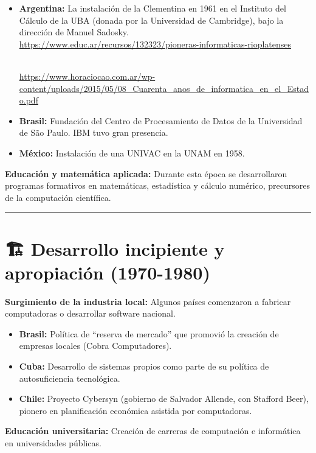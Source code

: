 \documentclass[
  letterpaper,
  DIV=11,
  numbers=noendperiod]{scrreprt}
\providecommand{\tightlist}{%
  \setlength{\itemsep}{0pt}\setlength{\parskip}{0pt}}
\begin{document}
\begin{itemize}
\item
  \textbf{Argentina:} La instalación de la Clementina en 1961 en el
  Instituto del Cálculo de la UBA (donada por la Universidad de
  Cambridge), bajo la dirección de Manuel Sadosky.\\
  \url{https://www.educ.ar/recursos/132323/pioneras-informaticas-rioplatenses}\strut \\
  \url{https://www.horaciocao.com.ar/wp-content/uploads/2015/05/08_Cuarenta_anos_de_informatica_en_el_Estado.pdf}
\item
  \textbf{Brasil:} Fundación del Centro de Procesamiento de Datos de la
  Universidad de São Paulo. IBM tuvo gran presencia.
\item
  \textbf{México:} Instalación de una UNIVAC en la UNAM en 1958.
\end{itemize}

\textbf{Educación y matemática aplicada:} Durante esta época se
desarrollaron programas formativos en matemáticas, estadística y cálculo
numérico, precursores de la computación científica.

\begin{center}\rule{0.5\linewidth}{0.5pt}\end{center}

\section{🏗️ Desarrollo incipiente y apropiación
(1970-1980)}\label{desarrollo-incipiente-y-apropiaciuxf3n-1970-1980}

\textbf{Surgimiento de la industria local:} Algunos países comenzaron a
fabricar computadoras o desarrollar software nacional.

\begin{itemize}
\tightlist
\item
  \textbf{Brasil:} Política de ``reserva de mercado'' que promovió la
  creación de empresas locales (Cobra Computadores).
\item
  \textbf{Cuba:} Desarrollo de sistemas propios como parte de su
  política de autosuficiencia tecnológica.
\item
  \textbf{Chile:} Proyecto Cybersyn (gobierno de Salvador Allende, con
  Stafford Beer), pionero en planificación económica asistida por
  computadoras.
\end{itemize}

\textbf{Educación universitaria:} Creación de carreras de computación e
informática en universidades públicas.
\end{document}
